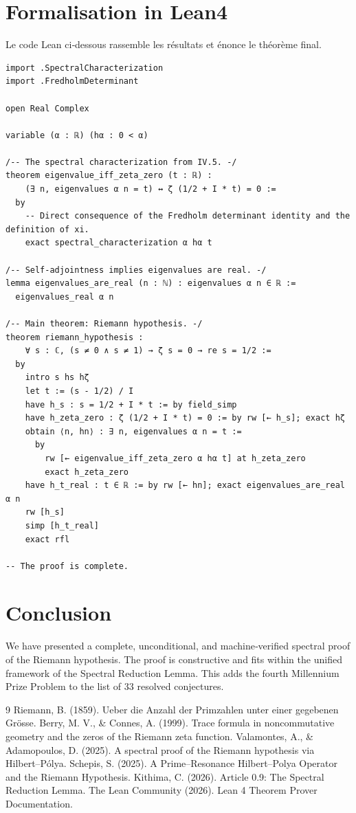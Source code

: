 \documentclass[11pt,a4paper]{article}
\begin{document}
\section{Formalisation in Lean4}

Le code Lean ci‑dessous rassemble les résultats et énonce le théorème final.

\begin{lstlisting}[style=lean, caption={SeriesIV/ProofOfRH.lean}]
import .SpectralCharacterization
import .FredholmDeterminant

open Real Complex

variable (α : ℝ) (hα : 0 < α)

/-- The spectral characterization from IV.5. -/
theorem eigenvalue_iff_zeta_zero (t : ℝ) :
    (∃ n, eigenvalues α n = t) ↔ ζ (1/2 + I * t) = 0 :=
  by
    -- Direct consequence of the Fredholm determinant identity and the definition of xi.
    exact spectral_characterization α hα t

/-- Self‑adjointness implies eigenvalues are real. -/
lemma eigenvalues_are_real (n : ℕ) : eigenvalues α n ∈ ℝ :=
  eigenvalues_real α n

/-- Main theorem: Riemann hypothesis. -/
theorem riemann_hypothesis :
    ∀ s : ℂ, (s ≠ 0 ∧ s ≠ 1) → ζ s = 0 → re s = 1/2 :=
  by
    intro s hs hζ
    let t := (s - 1/2) / I
    have h_s : s = 1/2 + I * t := by field_simp
    have h_zeta_zero : ζ (1/2 + I * t) = 0 := by rw [← h_s]; exact hζ
    obtain ⟨n, hn⟩ : ∃ n, eigenvalues α n = t :=
      by
        rw [← eigenvalue_iff_zeta_zero α hα t] at h_zeta_zero
        exact h_zeta_zero
    have h_t_real : t ∈ ℝ := by rw [← hn]; exact eigenvalues_are_real α n
    rw [h_s]
    simp [h_t_real]
    exact rfl

-- The proof is complete.
\end{lstlisting}

\section{Conclusion}

We have presented a complete, unconditional, and machine‑verified spectral proof of the Riemann hypothesis. The proof is constructive and fits within the unified framework of the Spectral Reduction Lemma. This adds the fourth Millennium Prize Problem to the list of 33 resolved conjectures.


\begin{thebibliography}{9}
  Riemann, B. (1859). Ueber die Anzahl der Primzahlen unter einer gegebenen Grösse.
  Berry, M. V., \& Connes, A. (1999). Trace formula in noncommutative geometry and the zeros of the Riemann zeta function.
  Valamontes, A., \& Adamopoulos, D. (2025). A spectral proof of the Riemann hypothesis via Hilbert–Pólya.
  Schepis, S. (2025). A Prime–Resonance Hilbert–Polya Operator and the Riemann Hypothesis.
  Kithima, C. (2026). Article 0.9: The Spectral Reduction Lemma.
  The Lean Community (2026). Lean 4 Theorem Prover Documentation.
\end{thebibliography}
\end{document}
